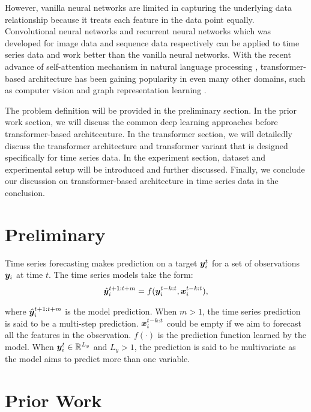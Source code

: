 \documentclass{article} %
\begin{document}
However, vanilla neural networks are limited in capturing the underlying data relationship because it treats each feature in the data point equally.
Convolutional neural networks and recurrent neural networks which was developed for image data and sequence data respectively can be applied to time series data and work better than the vanilla neural networks.
With the recent advance of self-attention mechanism in natural language processing \citep{vaswani2017attention}, transformer-based architecture has been gaining popularity in even many other domains, such as computer vision \citep{dosovitskiy2020image} and graph representation learning \citep{shi2021masked}.

The problem definition will be provided in the preliminary section. In the prior work section, we will discuss the common deep learning approaches before transformer-based architecuture.
In the transformer section, we will detailedly discuss the transformer architecture and transformer variant that is designed specifically for time series data.
In the experiment section, dataset and experimental setup will be introduced and further discussed.
Finally, we conclude our discussion on transformer-based architecture in time series data in the conclusion.

\section{Preliminary}

Time series forecasting makes prediction on a target ${\bm{y}}_{i}^{t}$ for a set of observations ${\bm{y}}_{i}$ at time $t$.
The time series models take the form:
\begin{align}
        \hat{{\bm{y}}}_{i}^{t+1:t+m} = f({\bm{y}}_{i}^{t-k:t}, {\bm{x}}_{i}^{t-k:t}),
\end{align}

where $\hat{{\bm{y}}}_{i}^{t+1:t+m}$ is the model prediction.
When $m > 1$, the time series prediction is said to be a multi-step prediction.
${\bm{x}}_{i}^{t-k:t}$ could be empty if we aim to forecast all the features in the observation.
$f(\cdot)$ is the prediction function learned by the model.
When ${\bm{y}}_{i}^{t} \in \mathbb{R}^{L_{y}}$ and $L_{y} > 1$, the prediction is said to be multivariate as the model aims to predict more than one variable.


\section{Prior Work}
\end{document}
